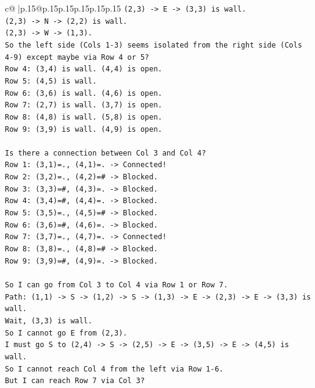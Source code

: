 \documentclass{article}
\begin{document}
{\begin{supertabular}{c@{$\;$}|p{.15\linewidth}@{}p{.15\linewidth}p{.15\linewidth}p{.15\linewidth}p{.15\linewidth}p{.15\linewidth}}
{{{\texttt{(2,3) {-}> E {-}> (3,3) is wall.} \\
\texttt{(2,3) {-}> N {-}> (2,2) is wall.} \\
\texttt{(2,3) {-}> W {-}> (1,3).} \\
\texttt{So the left side (Cols 1{-}3) seems isolated from the right side (Cols 4{-}9) except maybe via Row 4 or 5?} \\
\texttt{Row 4: (3,4) is wall. (4,4) is open.} \\
\texttt{Row 5: (4,5) is wall.} \\
\texttt{Row 6: (3,6) is wall. (4,6) is open.} \\
\texttt{Row 7: (2,7) is wall. (3,7) is open.} \\
\texttt{Row 8: (4,8) is wall. (5,8) is open.} \\
\texttt{Row 9: (3,9) is wall. (4,9) is open.} \\
\\ 
\texttt{Is there a connection between Col 3 and Col 4?} \\
\texttt{Row 1: (3,1)=., (4,1)=. {-}> Connected!} \\
\texttt{Row 2: (3,2)=., (4,2)=\# {-}> Blocked.} \\
\texttt{Row 3: (3,3)=\#, (4,3)=. {-}> Blocked.} \\
\texttt{Row 4: (3,4)=\#, (4,4)=. {-}> Blocked.} \\
\texttt{Row 5: (3,5)=., (4,5)=\# {-}> Blocked.} \\
\texttt{Row 6: (3,6)=\#, (4,6)=. {-}> Blocked.} \\
\texttt{Row 7: (3,7)=., (4,7)=. {-}> Connected!} \\
\texttt{Row 8: (3,8)=., (4,8)=\# {-}> Blocked.} \\
\texttt{Row 9: (3,9)=\#, (4,9)=. {-}> Blocked.} \\
\\ 
\texttt{So I can go from Col 3 to Col 4 via Row 1 or Row 7.} \\
\texttt{Path: (1,1) {-}> S {-}> (1,2) {-}> S {-}> (1,3) {-}> E {-}> (2,3) {-}> E {-}> (3,3) is wall.} \\
\texttt{Wait, (3,3) is wall.} \\
\texttt{So I cannot go E from (2,3).} \\
\texttt{I must go S to (2,4) {-}> S {-}> (2,5) {-}> E {-}> (3,5) {-}> E {-}> (4,5) is wall.} \\
\texttt{So I cannot reach Col 4 from the left via Row 1{-}6.} \\
\texttt{But I can reach Row 7 via Col 3?} \\
}}}
\end{supertabular}}
\end{document}
